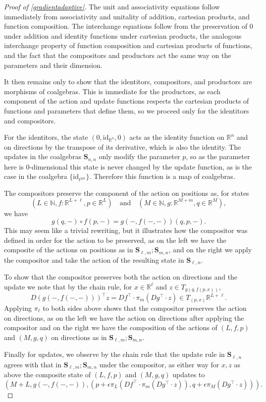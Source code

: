 \documentclass[11pt, one side, article]{memoir}
\theoremstyle{definition}
\theoremstyle{plain}
\newcommand{\Cat}[1]{\mathbf{#1}}%
\newcommand{\id}{\mathrm{id}}
\newcommand{\nn}{\mathbb{N}}
\newcommand{\rr}{\mathbb{R}}
\newcommand{\0}{\textsf{0}}
\newcommand{\1}{\tn{\textsf{1}}}
\renewcommand{\S}{{\Cat{S}}}
\newcommand{\idcoalg}[1]{{\{\id_{#1}\}}}
\begin{document}
\begin{proof}[Proof of \cref{gradientadaptive}]
The unit and associativity equations follow immediately from associativity and unitality of addition, cartesian products, and function composition. The interchange equations follow from the preservation of 0 under addition and identity functions under cartesian products, the analogous interchange property of function composition and cartesian products of functions, and the fact that the compositors and productors act the same way on the parameters and their dimension. 

It then remains only to show that the identitors, compositors, and productors are morphisms of coalgebras. This is immediate for the productors, as each component of the action and update functions respects the cartesian products of functions and parameters that define them, so we proceed only for the identitors and compositors.

For the identitors, the state $(0,\id_{\rr^n},0)$ acts as the identity function on $\rr^n$ and on directions by the transpose of its derivative, which is also the identity. The updates in the coalgebras $\S_{n,n}$ only modify the parameter $p$, so as the parameter here is 0-dimensional this state is never changed by the update function, as is the case in the coalgebra $\idcoalg{t^{\otimes n}}$. Therefore this function is a map of coalgebras.

The compositors preserve the component of the action on positions as, for states 
\[(L \in \nn, f\colon \rr^{L+\ell}, p \in \rr^L) \quad \textrm{and} \quad (M \in \nn, g\colon \rr^{M+m}, q \in \rr^M),\]
we have 
\[g(q,-) \circ f(p,-) = g(-,f(-,-))(q,p,-).\]
This may seem like a trivial rewriting, but it illustrates how the compositor was defined in order for the action to be preserved, as on the left we have the composite of the actions on positions as in $\S_{\ell,m};\S_{m,n}$, and on the right we apply the compositor and take the action of the resulting state in $\S_{\ell,n}$.

To show that the compositor preserves both the action on directions and the update we note that by the chain rule, for $x \in \rr^\ell$ and $z \in T_{g(q,f(p,x))}$,
\[D\left( g(-,f(-,-)) \right)^\top z = Df^\top \cdot \pi_m(Dg^\top \cdot z) \in T_{(p,x)}\rr^{L+\ell}.\]
Applying $\pi_\ell$ to both sides above shows that the compositor preserves the action on directions, as on the left we have the action on directions after applying the compositor and on the right we have the composition of the actions of $(L,f,p)$ and $(M,g,q)$ on directions as in $\S_{\ell,m};\S_{m,n}$.

Finally for updates, we observe by the chain rule that the update rule in $\S_{\ell,n}$ agrees with that in $\S_{\ell,m};\S_{m,n}$ under the compositor, as either way for $x,z$ as above the composite state of $(L,f,p)$ and $(M,g,q)$ updates to 
\[\left( M+L,g(-,f(-,-)),\left( p + \epsilon \pi_L (Df^\top \cdot \pi_m(Dg^\top \cdot z)),q + \epsilon \pi_M(Dg^\top \cdot z) \right) \right).\]
\end{proof}




\printbibliography 
\end{document}
